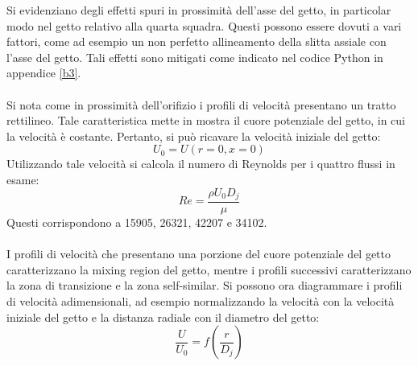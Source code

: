 \noindent Si evidenziano degli effetti spuri in prossimità dell'asse del getto, in particolar modo nel getto relativo alla quarta squadra. Questi possono essere dovuti a vari fattori, come ad esempio un non perfetto allineamento della slitta assiale con l'asse del getto. Tali effetti sono mitigati come indicato nel codice Python in appendice \ref{b3}.\\\\
Si nota come in prossimità dell'orifizio i profili di velocità presentano un tratto rettilineo. Tale caratteristica mette in mostra il cuore potenziale del getto, in cui la velocità è costante. Pertanto, si può ricavare la velocità iniziale del getto:
\begin{equation*}
    U_0 = U(r=0, x=0)
\end{equation*}
Utilizzando tale velocità si calcola il numero di Reynolds per i quattro flussi in esame:
\begin{equation*}
    Re = \frac{\rho U_0 D_j}{\mu}
\end{equation*}
Questi corrispondono a 15905, 26321, 42207 e 34102.\\\\
I profili di velocità che presentano una porzione del cuore potenziale del getto caratterizzano la mixing region del getto, mentre i profili successivi caratterizzano la zona di transizione e la zona self-similar.
\newpage
\noindent Si possono ora diagrammare i profili di velocità adimensionali, ad esempio normalizzando la velocità con la velocità iniziale del getto e la distanza radiale con il diametro del getto:
\begin{equation*}
    \frac U {U_0} = f\left(\frac r{D_j} \right)
\end{equation*}
